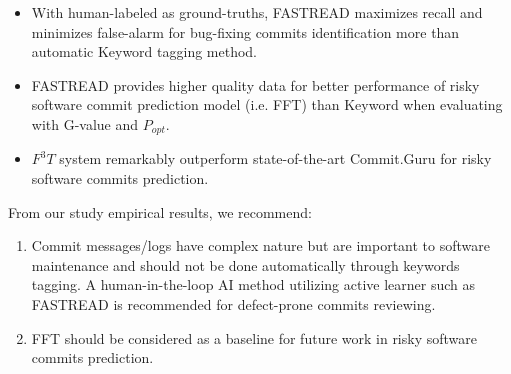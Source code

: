 \documentclass[sigconf,review, anonymous]{acmart}
\newcommand{\bi}{\begin{itemize}[leftmargin=0.4cm]}
\newcommand{\ei}{\end{itemize}}
\begin{document}
\bi
\item With human-labeled as ground-truths, FASTREAD maximizes recall and minimizes false-alarm for bug-fixing commits identification more than automatic Keyword tagging method.
\item FASTREAD provides higher quality data for better performance of risky software commit prediction model (i.e. FFT) than Keyword when evaluating with G-value and $P_{opt}$.  
\item $F^3T$ system remarkably outperform state-of-the-art Commit.Guru for risky software commits prediction. 
\ei

From our study empirical results, we recommend:
\begin{enumerate}
    \item Commit messages/logs have complex nature but are important to software maintenance and should not be done automatically through keywords tagging. A human-in-the-loop AI method utilizing active learner such as FASTREAD is recommended for defect-prone commits reviewing.   
    \item FFT should be considered as a baseline for future work in risky software commits prediction. 
\end{enumerate} 



\balance


% 
% 


\end{document}
